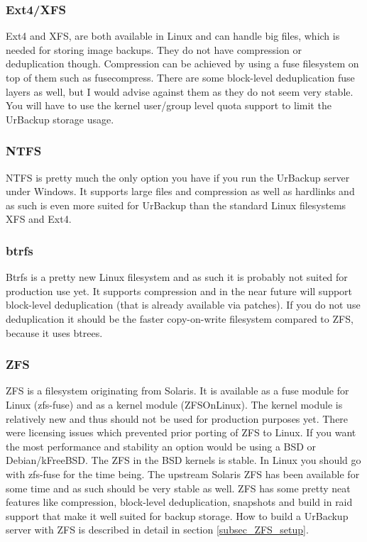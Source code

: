 \documentclass[a4paper,10pt]{article}
\begin{document}
\subsubsection{Ext4/XFS}

Ext4 and XFS, are both available in Linux and can handle big files, which is needed for storing image backups. They do not have compression or deduplication though. Compression can be achieved by using a fuse filesystem on top of them such as fusecompress. There are some block-level deduplication fuse layers as well, but I would advise against them as they do not seem very stable. You will have to use the kernel user/group level quota support to limit the UrBackup storage usage.

\subsubsection{NTFS}

NTFS is pretty much the only option you have if you run the UrBackup server under Windows. It supports large files and compression as well as hardlinks and as such is even more suited for UrBackup than the standard Linux filesystems XFS and Ext4. 

\subsubsection{btrfs}

Btrfs is a pretty new Linux filesystem and as such it is probably not suited for production use yet. It supports compression and in the near future will support block-level deduplication (that is already available via patches). If you do not use deduplication it should be the faster copy-on-write filesystem compared to ZFS, because it uses btrees.

\subsubsection{ZFS}

ZFS is a filesystem originating from Solaris. It is available as a fuse module for Linux (zfs-fuse) and as a kernel module (ZFSOnLinux). The kernel module is relatively new and thus should not be used for production purposes yet. There were licensing issues which prevented prior porting of ZFS to Linux. If you want the most performance and stability an option would be using a BSD or Debian/kFreeBSD. The ZFS in the BSD kernels is stable. In Linux you should go with zfs-fuse for the time being. The upstream Solaris ZFS has been available for some time and as such should be very stable as well. ZFS has some pretty neat features like compression, block-level deduplication, snapshots and build in raid support that make it well suited for backup storage. How to build a UrBackup server with ZFS is described in detail in section \ref{subsec_ZFS_setup}.
\end{document}
